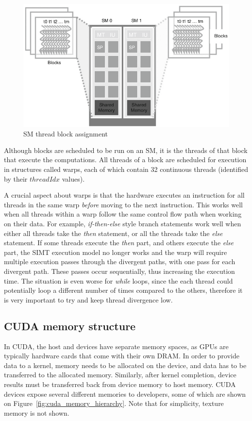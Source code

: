 \documentclass[10pt, a4paper]{report}
\begin{document}
\begin{figure}
\centering
\includegraphics[scale=0.4]{figs/sm_thread_block_assignment}
\caption{SM thread block assignment}
\label{fig:sm_thread_block_assignment}
\end{figure}

Although blocks are scheduled to be run on an SM, it is the threads of that
block that execute the computations.
All threads of a block are scheduled for execution in structures called warps,
each of which contain 32 continuous threads (identified by their $threadIdx$
values).

A crucial aspect about warps is that the hardware executes an instruction for
all threads in the same warp \emph{before} moving to the next instruction.
This works well when all threads within a warp follow the same control flow path
when working on their data.
For example, \emph{if-then-else} style branch statements work well when either
all threads take the \emph{then} statement, or all the threads take the
\emph{else} statement.
If some threads execute the \emph{then} part, and others execute the \emph{else}
part, the SIMT execution model no longer works and the warp will require
multiple execution passes through the divergent paths, with one pass for each
divergent path.
These passes occur sequentially, thus increasing the execution time.
The situation is even worse for \emph{while} loops, since the each thread could
potentially loop a different number of times compared to the others, therefore
it is very important to try and keep thread divergence low.

\subsection{CUDA memory structure}
In CUDA, the host and devices have separate memory spaces, as GPUs are typically
hardware cards that come with their own DRAM.
In order to provide data to a kernel, memory needs to be allocated on the
device, and data has to be transferred to the allocated memory.
Similarly, after kernel completion, device results must be transferred back from
device memory to host memory.
CUDA devices expose several different memories to developers, some of which are
shown on Figure~\ref{fig:cuda_memory_hierarchy}.
Note that for simplicity, texture memory is not shown.
\end{document}
